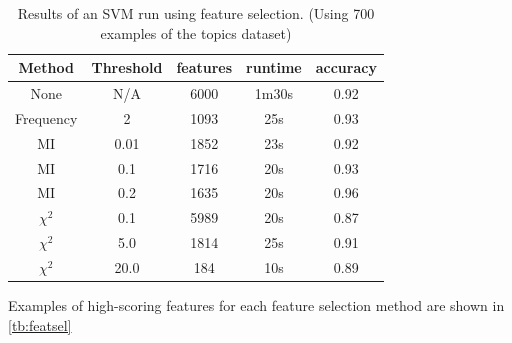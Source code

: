 \documentclass[fontsize=10pt,twocolumn,letterpaper,abstracton]{scrartcl}
\begin{document}
\begin{table}[ht]
\centering
\begin{tabular}{ c | c | c | c | c }
Method & Threshold & features & runtime & accuracy\\
\hline
None & N/A & 6000 & 1m30s & 0.92\\
Frequency & 2 & 1093 & 25s & 0.93\\
MI & 0.01 & 1852 & 23s & 0.92\\
MI & 0.1 & 1716 & 20s & 0.93\\
MI & 0.2 & 1635 & 20s & 0.96\\
$\chi^{2}$ & 0.1 & 5989 & 20s & 0.87 \\
$\chi^{2}$ & 5.0 & 1814 & 25s & 0.91\\
$\chi^{2}$ & 20.0 & 184 & 10s & 0.89\\
\end{tabular}
\caption{Results of an SVM run using feature selection.  (Using 700 examples of the topics dataset)}
\label{tb:nb-inf}
\end{table}

Examples of high-scoring features for each feature selection method are shown in \ref{tb:featsel}
\end{document}
